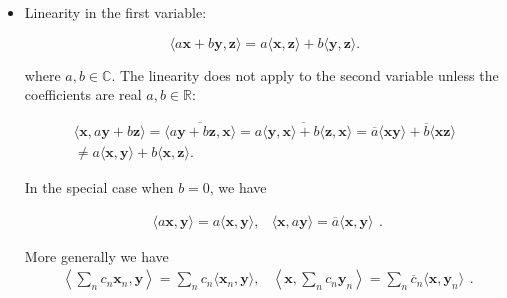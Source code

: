 \documentclass[10pt,b5paper,titlepage]{book}
\begin{document}
\begin{itemize}
\begin{itemize}
             \item Linearity in the first variable:

                 \begin{equation}
                     \langle a \mathbf{x} + b \mathbf{y}, \mathbf{z} \rangle
                     = a \langle \mathbf{x}, \mathbf{z} \rangle
                     + b \langle \mathbf{y}, \mathbf{z} \rangle
                 .\end{equation}

                 where $a, b \in \mathbb{C}$. The linearity does not apply
                 to the second variable unless the coefficients are real
                 $a, b \in \mathbb{R}$:

                 \begin{equation}
                     \begin{array}{l}
                         \langle \mathbf{x}, a \mathbf{y} + b \mathbf{z} \rangle
                         = \overline{\langle a \mathbf{y} + b \mathbf{z}, \mathbf{x} \rangle}
                         = \overline{a \langle \mathbf{y}, \mathbf{x} \rangle + b \langle \mathbf{z}, \mathbf{x} \rangle}
                         = \overline{a} \langle \mathbf{x} \mathbf{y} \rangle
                         + \overline{b} \langle \mathbf{x} \mathbf{z} \rangle \\
                         \neq a \langle \mathbf{x}, \mathbf{y} \rangle
                         + b \langle \mathbf{x}, \mathbf{z} \rangle.
                     \end{array}
                 \end{equation}

                 In the special case when $b=0$, we have

                 \begin{equation}
                     \begin{array}{lr}
                         \langle a \mathbf{x}, \mathbf{y} \rangle
                         = a \langle \mathbf{x}, \mathbf{y} \rangle, &
                         \langle \mathbf{x}, a \mathbf{y} \rangle
                         = \overline{a} \langle \mathbf{x}, \mathbf{y} \rangle
                     \end{array}
                 .\end{equation}

                 More generally we have
                  \begin{equation}
                      \begin{array}{lr}
                          \left\langle \sum_{n} c_n \mathbf{x}_{n}, \mathbf{y} \right\rangle
                          = \sum_{n} c_n \langle \mathbf{x}_{n}, \mathbf{y} \rangle, &
                          \left\langle \mathbf{x}, \sum_{n} c_{n} \mathbf{y}_{n} \right\rangle
                          = \sum_{n} \overline{c}_{n} \langle \mathbf{x}, \mathbf{y}_{n} \rangle
                      \end{array}
                 .\end{equation}


\end{itemize}
\end{itemize}
\end{document}
